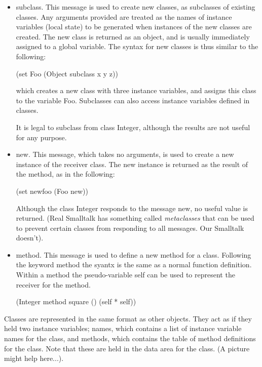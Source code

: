 \begin{itemize}
    \item {\sf subclass}.  This message is used to create new classes, as
    subclasses of existing classes.  Any arguments provided are treated as the
    names of instance variables (local state) to be generated when instances of
    the new classes are created.  The new class is returned as an object, and is
    usually immediately assigned to a global variable.  The syntax for new
    classes is thus similar to the following:
    \begin{center}
        {\sf (set Foo (Object subclass x y z))}
    \end{center}
    which creates a new class with three instance variables, and assigns this
    class to the variable {\sf Foo}.  Subclasses can also access instance
    variables defined in classes.

    It is legal to subclass from class {\sf Integer}, although the results are
    not useful for any purpose.

    \item {\sf new}.  This message, which takes no arguments, is used to create
    a new instance of the receiver class.  The new instance is returned as the
    result of the method, as in the following:
    \begin{center}
        {\sf (set newfoo (Foo new))}
    \end{center}
    Although the class {\sf Integer} responds to the message {\sf new}, no
    useful value is returned.  (Real Smalltalk has something called {\em
        metaclasses} that can be used to prevent certain classes from responding
    to all messages.  Our Smalltalk doesn't).
    \item {\sf method}.  This message is used to define a new method for a
    class.  Following the keyword {\sf method} the syantx is the same as a
    normal function definition.  Within a method the pseudo-variable {\sf self}
    can be used to represent the receiver for the method.
    \begin{center}
        {\sf (Integer method square () (self * self))}
    \end{center}
\end{itemize}

Classes are represented in the same format as other objects.  They act as if
they held two instance variables; {\sf names}, which contains a list of instance
variable names for the class, and {\sf methods}, which contains the table of
method definitions for the class.  Note that these are held in the data area for
the class.  (A picture might help here...).

